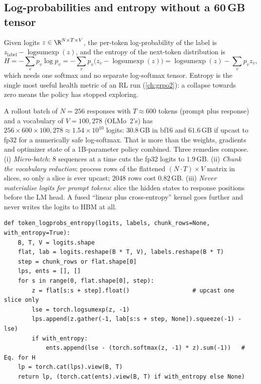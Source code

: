 \subsection{Log-probabilities and entropy without a 60\,GB tensor}\label{sec:pg:logprobs}

Given logits $z\in\R^{N\times T\times V}$, the per-token log-probability of the label is
$z_{\text{label}}-\operatorname{logsumexp}(z)$, and the entropy of the next-token distribution
is
\begin{equation}
H=-\sum_v p_v\log p_v=-\sum_v p_v\big(z_v-\operatorname{logsumexp}(z)\big)
 =\operatorname{logsumexp}(z)-\sum_v p_v z_v ,
\label{eq:pg:entropy}
\end{equation}
which needs one softmax and no separate log-softmax tensor. Entropy is the single most useful
health metric of an RL run (\cref{ch:grpo2}): a collapse towards zero means the policy has
stopped exploring.

\begin{napkinmath}
A rollout batch of $N=256$ responses with $T\approx600$ tokens (prompt plus response) and a
vocabulary of $V=100{,}278$ (OLMo~2's) has
$256\times600\times100{,}278\approx1.54\times10^{10}$ logits: $30.8$\,GB in bf16 and
$61.6$\,GB if upcast to fp32 for a numerically safe log-softmax. That is more than the
weights, gradients and optimizer state of a 1B-parameter policy combined. Three remedies
compose. (i) \emph{Micro-batch}: 8 sequences at a time cuts the fp32 logits to $1.9$\,GB.
(ii) \emph{Chunk the vocabulary reduction}: process rows of the flattened $(N\cdot T)\times V$
matrix in slices, so only a slice is ever upcast; 2048 rows cost $0.82$\,GB. (iii) \emph{Never
materialise logits for prompt tokens}: slice the hidden states to response positions before
the LM head. A fused ``linear plus cross-entropy'' kernel goes further and never writes the
logits to HBM at all.
\end{napkinmath}

\begin{lstlisting}[caption={Chunked per-token log-probabilities and entropies in fp32 (\code{llmsys.pg.token\_logprobs\_entropy}).},label={lst:pg:logprobs}]
def token_logprobs_entropy(logits, labels, chunk_rows=None, with_entropy=True):
    B, T, V = logits.shape
    flat, lab = logits.reshape(B * T, V), labels.reshape(B * T)
    step = chunk_rows or flat.shape[0]
    lps, ents = [], []
    for s in range(0, flat.shape[0], step):
        z = flat[s:s + step].float()                  # upcast one slice only
        lse = torch.logsumexp(z, -1)
        lps.append(z.gather(-1, lab[s:s + step, None]).squeeze(-1) - lse)
        if with_entropy:
            ents.append(lse - (torch.softmax(z, -1) * z).sum(-1))   # Eq. for H
    lp = torch.cat(lps).view(B, T)
    return lp, (torch.cat(ents).view(B, T) if with_entropy else None)
\end{lstlisting}

